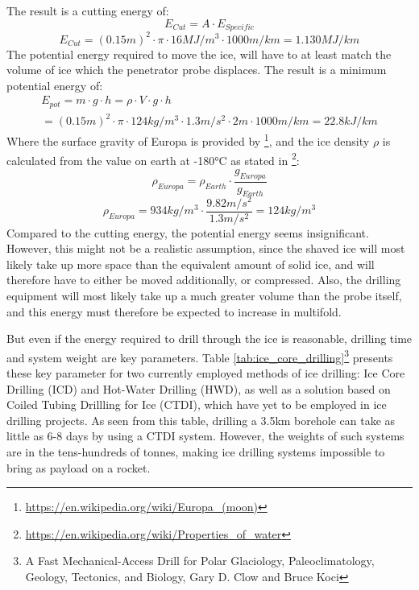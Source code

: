 The result is a cutting energy of:
\begin{equation}
    E_{Cut} = A \cdot E_{Specific}
\end{equation}
\begin{equation}
    E_{Cut} = (0.15m)^2 \cdot \pi \cdot 16MJ/m^3 \cdot 1000m/km = 1.130 MJ/km
\end{equation}
The potential energy required to move the ice, will have to at least match the volume of ice which the penetrator probe displaces.  The result is a minimum potential energy of:
\begin{multline}
E_{pot} = m \cdot g \cdot h = \rho \cdot V \cdot g \cdot h\\
 = (0.15m)^2 \cdot \pi \cdot 124kg/m^3 \cdot 1.3m/s^2 \cdot 2m \cdot 1000m/km = 22.8 kJ/km
\end{multline}
Where the surface gravity of Europa is provided by \footnote{\url{https://en.wikipedia.org/wiki/Europa_(moon)}}, and the ice density $\rho$ is calculated from the value on earth at -180°C as stated in \footnote{\url{https://en.wikipedia.org/wiki/Properties_of_water}}:
\begin{equation}
\rho_{Europa} = \rho_{Earth} \cdot \frac{g_{Europa}}{g_{Earth}}
\end{equation}
\begin{equation}
\rho_{Europa} = 934kg/m^3 \cdot \frac{9.82m/s^2}{1.3m/s^2} = 124kg/m^3
\end{equation}
Compared to the cutting energy, the potential energy seems insignificant. However, this might not be a realistic assumption, since the shaved ice will most likely take up more space than the equivalent amount of solid ice, and will therefore have to either be moved additionally, or compressed. Also, the drilling equipment will most likely take up a much greater volume than the probe itself, and this energy must therefore be expected to increase in multifold.

But even if the energy required to drill through the ice is reasonable, drilling time and system weight are key parameters. Table \ref{tab:ice_core_drilling}\footnote{A Fast Mechanical-Access Drill for Polar Glaciology, Paleoclimatology, Geology, Tectonics, and Biology, Gary D. Clow and Bruce Koci}  presents these key parameter for two currently employed methods of ice drilling: Ice Core Drilling (ICD) and Hot-Water Drilling (HWD), as well as a solution based on Coiled Tubing Drillling for Ice (CTDI), which have yet to be employed in ice drilling projects. As seen from this table, drilling a 3.5km borehole can take as little as 6-8 days by using a CTDI system. However, the weights of such systems are in the tens-hundreds of tonnes, making ice drilling systems impossible to bring as payload on a rocket.

